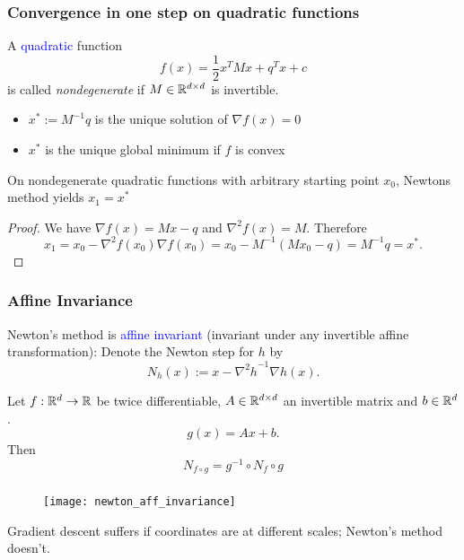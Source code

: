\documentclass{beamer}
\begin{document}
\begin{frame}
  \frametitle{Convergence in one step on quadratic functions}
  A \textcolor{blue}{quadratic} function
  \begin{equation}
    f(x) = \frac12 x^T M x + q^T x + c
  \end{equation}
  is called \textit{nondegenerate} if $M \in \mathbb{R}^{d \times d}$ is invertible.
  \begin{itemize}
    \item $x^* := M^{-1}q$ is the unique solution of $\nabla f(x) = 0$
    \item $x^*$ is the unique global minimum if $f$ is convex
  \end{itemize}
  \begin{lemma}%
    On nondegenerate quadratic functions with arbitrary starting point $x_0$, Newtons method yields $x_1=x^*$
  \end{lemma}
  \begin{proof}
    We have $\nabla f(x) = Mx -q$ and $\nabla^2 f(x) = M$. Therefore
    \begin{equation}
      x_1 = x_0 - \nabla^2 f(x_0) \nabla f(x_0) = x_0 - M^{-1}(M x_0 - q) = M^{-1}q = x^*.
    \end{equation}
  \end{proof}
\end{frame}

\begin{frame}
  \frametitle{Affine Invariance}
  Newton’s method is \textcolor{blue}{affine invariant}
  (invariant under any invertible affine transformation):
  Denote the Newton step for $h$ by
  \begin{equation}
    N_h(x) := x - {\nabla^2 h }^{-1} \nabla h(x).
  \end{equation}
  \begin{lemma}%
    Let $f: \mathbb{R}^d \to \mathbb{R}$ be twice differentiable, $A \in \mathbb{R}^{d \times d}$ an invertible matrix and $b \in \mathbb{R}^d$.
    \begin{equation}
      g(x) = Ax + b.
    \end{equation}
    Then
    \begin{equation}
      N_{f \circ g} = g^{-1} \circ N_f \circ g
    \end{equation}
  \end{lemma}
\end{frame}

\begin{frame}
  \frametitle{}
  \begin{figure}[ht]
    \centering
    \texttt{[image: newton\_aff\_invariance]}
  \end{figure}
  Gradient descent suffers if coordinates are at different scales; Newton's method doesn't.
\end{frame}
\end{document}
